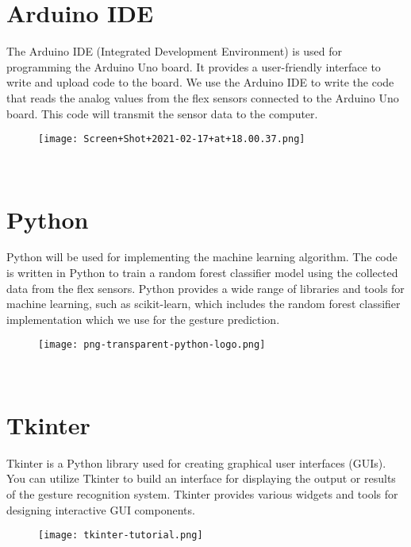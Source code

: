 \documentclass[a4paper,12pt,oneside]{report}
\begin{document}
 \section{Arduino IDE}
The Arduino IDE (Integrated Development
Environment) is used for programming the Arduino Uno board. It
provides a user-friendly interface to write and upload code to the
board. We use the Arduino IDE to write the code that reads the
analog values from the flex sensors connected to the Arduino Uno
board. This code will transmit the sensor data to the computer.
\begin{figure}[h]
    \centering
    \begin{minipage}{0.5\textwidth}
        \centering
        \texttt{[image: Screen+Shot+2021-02-17+at+18.00.37.png]}
        \label{fig:flex-sensor}
    \end{minipage}
\end{figure}
\\

 \section{Python}
Python will be used for implementing the machine learning
algorithm. The code is written in Python to train a random forest
classifier model using the collected data from the flex sensors.
Python provides a wide range of libraries and tools for machine
learning, such as scikit-learn, which includes the random forest
classifier implementation which we use for the gesture prediction.
\begin{figure}[h]
    \centering
    \begin{minipage}{0.5\textwidth}
        \centering
        \texttt{[image: png-transparent-python-logo.png]}
        \label{fig:flex-sensor}
    \end{minipage}
\end{figure}
\\
 \section{Tkinter}
Tkinter is a Python library used for creating graphical user
interfaces (GUIs). You can utilize Tkinter to build an interface for
displaying the output or results of the gesture recognition system. Tkinter
provides various widgets and tools for designing interactive GUI
components.
\begin{figure}[h]
    \centering
    \begin{minipage}{0.5\textwidth}
        \centering
        \texttt{[image: tkinter-tutorial.png]}
        \label{fig:flex-sensor}
    \end{minipage}
\end{figure}
\\
\end{document}
